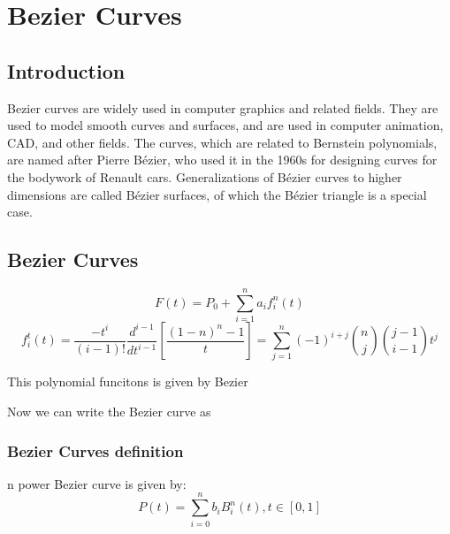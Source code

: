 \chapter{Bezier Curves}

\section{Introduction}
Bezier curves are widely used in computer graphics and related fields. They are used to model smooth curves and surfaces, and are used in computer animation, CAD, and other fields. The curves, which are related to Bernstein polynomials, are named after Pierre B\'ezier, who used it in the 1960s for designing curves for the bodywork of Renault cars. Generalizations of B\'ezier curves to higher dimensions are called B\'ezier surfaces, of which the B\'ezier triangle is a special case.

\section{Bezier Curves }

\begin{definition}

	\begin{equation*}
		F(t) = P_0 + \sum\limits_{i=1}^{n}a_if_i^{n}(t)
	\end{equation*}
	\begin{equation*}
		f_i^{t}(t) = \frac{-t^i}{(i-1)!}\frac{d^{i-1}}{dt^{i-1}} \left[\frac{(1-n)^{n}-1}{t}\right] = \sum\limits_{j=1}^{n}(-1)^{i+j}\binom{n}{j}\binom{j-1}{i-1}t^{j}
	\end{equation*}

	\label{def:bezier_curve}
\end{definition}

\begin{remark}
	This polynomial funcitons is given by Bezier
\end{remark}
Now we can write the Bezier curve as
\subsection{Bezier Curves definition}
\begin{definition}
	n power Bezier curve is given by:
	\begin{equation*}
		P(t) = \sum\limits_{i=0}^{n}b_iB_i^n(t),t\in[0,1]
	\end{equation*}
\end{definition}

